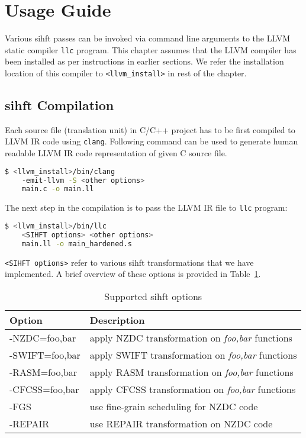 

\section{Usage Guide}

Various \ac{sihft} passes can be invoked via command line arguments to the LLVM static compiler \texttt{llc} program.
This chapter assumes that the LLVM compiler has been installed as per instructions in earlier sections.
We refer the installation location of this compiler to \texttt{<llvm\_install>} in rest of the chapter.

\subsection{\ac{sihft} Compilation}
Each source file (translation unit) in C/C++ project has to be first compiled to LLVM IR code using \texttt{clang}.
Following command can be used to generate human readable LLVM IR code representation of given C source file.
\begin{framed}
 \begin{lstlisting}[language=bash, basicstyle=\small\ttfamily]
$ <llvm_install>/bin/clang
    -emit-llvm -S <other options>
    main.c -o main.ll
  \end{lstlisting}
\end{framed}

The next step in the compilation is to pass the LLVM IR file to \texttt{llc} program:\\
\begin{lstlisting}[language=bash, basicstyle=\small\ttfamily, frame=single]
$ <llvm_install>/bin/llc
    <SIHFT options> <other options>
    main.ll -o main_hardened.s
\end{lstlisting}

\texttt{<SIHFT options>} refer to various \ac{sihft} transformations that we have implemented. A brief overview of these
options is provided in Table~\ref{tab:sihft-options}.

\begin{table}[htb]
 \centering
 \caption{Supported \ac{sihft} options}
 \label{tab:sihft-options}

 \begin{tabular}{|l|l|}
  \hline
  \textbf{Option} & \textbf{Description}                                     \\
  \hline
  -NZDC=foo,bar   & apply NZDC transformation on \textit{foo,bar} functions  \\
  -SWIFT=foo,bar  & apply SWIFT transformation on \textit{foo,bar} functions \\
  -RASM=foo,bar   & apply RASM transformation on \textit{foo,bar} functions  \\
  -CFCSS=foo,bar  & apply CFCSS transformation on \textit{foo,bar} functions \\
  -FGS            & use fine-grain scheduling for NZDC code                  \\
  -REPAIR         & use REPAIR transformation on NZDC code                   \\
  \hline
 \end{tabular}
\end{table}

